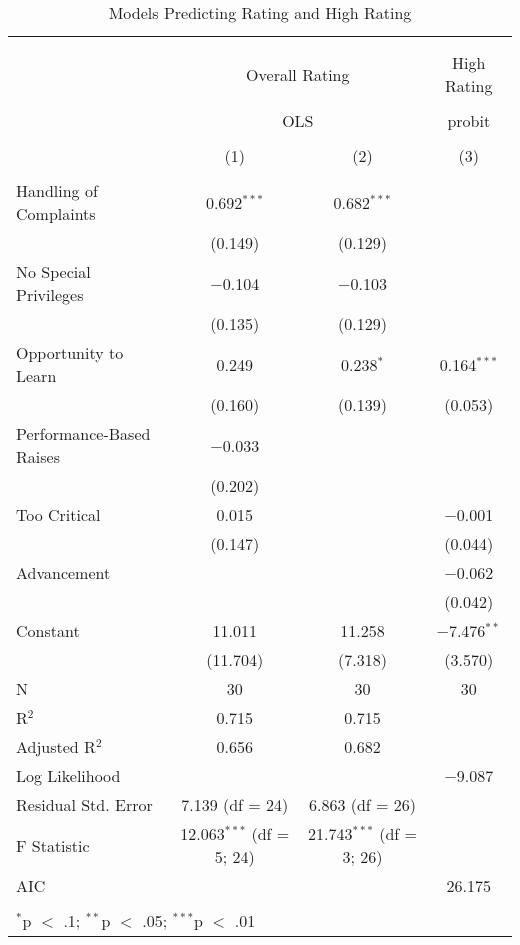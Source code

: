 \documentclass[12pt]{article}
\begin{document}
\begin{table}[ht] \centering 
  \caption{Models Predicting Rating and High Rating} 
  \label{tab:mods} 
\begin{tabular}{@{\extracolsep{5pt}}lccc} 
\\[-1.8ex]\hline \\[-1.8ex] 
\\[-1.8ex] & \multicolumn{2}{c}{Overall Rating} & High Rating \\ 
\\[-1.8ex] & \multicolumn{2}{c}{OLS} & probit \\ 
\\[-1.8ex] & (1) & (2) & (3)\\ 
\hline \\[-1.8ex] 
 Handling of Complaints & 0.692$^{***}$ & 0.682$^{***}$ &  \\ 
  & (0.149) & (0.129) &  \\ 
  No Special Privileges & $-$0.104 & $-$0.103 &  \\ 
  & (0.135) & (0.129) &  \\ 
  Opportunity to Learn & 0.249 & 0.238$^{*}$ & 0.164$^{***}$ \\ 
  & (0.160) & (0.139) & (0.053) \\ 
  Performance-Based Raises & $-$0.033 &  &  \\ 
  & (0.202) &  &  \\ 
  Too Critical & 0.015 &  & $-$0.001 \\ 
  & (0.147) &  & (0.044) \\ 
  Advancement &  &  & $-$0.062 \\ 
  &  &  & (0.042) \\ 
  Constant & 11.011 & 11.258 & $-$7.476$^{**}$ \\ 
  & (11.704) & (7.318) & (3.570) \\ 
 N & 30 & 30 & 30 \\ 
R$^{2}$ & 0.715 & 0.715 &  \\ 
Adjusted R$^{2}$ & 0.656 & 0.682 &  \\ 
Log Likelihood &  &  & $-$9.087 \\ 
Residual Std. Error & 7.139 (df = 24) & 6.863 (df = 26) &  \\ 
F Statistic & 12.063$^{***}$ (df = 5; 24) & 21.743$^{***}$ (df = 3; 26) &  \\ 
AIC &  &  & 26.175 \\ 
\hline \\[-1.8ex] 
\multicolumn{4}{l}{$^{*}$p $<$ .1; $^{**}$p $<$ .05; $^{***}$p $<$ .01} \\ 
\end{tabular} 
\end{table}
\end{document}
